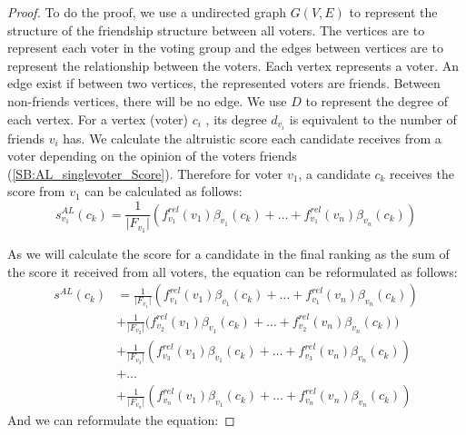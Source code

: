 \documentclass{article}
\begin{document}
\begin{proof}
    

To do the proof, we use a undirected graph $G(V,E)$ to represent the structure of the friendship structure between all voters.  The vertices are to represent each voter in the voting group and the edges between vertices are to represent the relationship between the voters.  Each vertex represents a voter. An edge exist if between two vertices,  the represented voters are friends. Between non-friends vertices, there will be no edge. 
We use $D$ to represent the degree of each vertex. For a vertex (voter) $c_i$ , its degree $d_{v_i}$ is equivalent to the number of friends $v_i$ has. 
We calculate the altruistic score each candidate receives from a voter depending on the opinion of the voters friends  (\ref{SB:AL_singlevoter_Score}). Therefore for voter $v_1$, a candidate $c_k$ receives the score from $v_1$ can be calculated as follows:
\begin{equation*}
s_{v_1}^{AL}(c_k) = \frac{1}{\vert F_{v_1}\vert}(f_{v_1}^{rel}(v_1)\beta_{v_1}(c_k) + \dots + f_{v_1}^{rel}(v_n)\beta_{v_n}(c_k))
\end{equation*}

As we will calculate the score for a candidate in the final ranking as the sum of the score it received from all voters, the equation can be reformulated as follows:
\begin{equation*}
\begin{split}
s^{AL}(c_k) &= \frac{1}{\vert F_{v_1}\vert}(f_{v_1}^{rel}(v_1)\beta_{v_1}(c_k) + \dots + f_{v_1}^{rel}(v_n)\beta_{v_n}(c_k)) \\
            &+ \frac{1}{\vert F_{v_2}\vert}\Big(f_{v_2}^{rel}(v_1)\beta_{v_1}(c_k) + \dots + f_{v_2}^{rel}(v_n)\beta_{v_n}(c_k)\Big) \\
            &+ \frac{1}{\vert F_{v_3}\vert}(f_{v_3}^{rel}(v_1)\beta_{v_1}(c_k) + \dots + f_{v_3}^{rel}(v_n)\beta_{v_n}(c_k)) \\
            &+ \dots \\ 
            &+ \frac{1}{\vert F_{v_n}\vert}(f_{v_n}^{rel}(v_1)\beta_{v_1}(c_k) + \dots + f_{v_n}^{rel}(v_n)\beta_{v_n}(c_k))
\end{split}
\end{equation*}
And we can reformulate the equation:


\end{proof}
\end{document}
